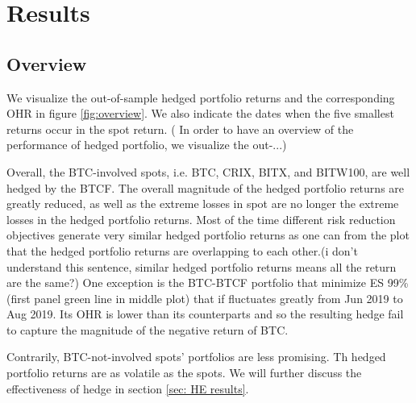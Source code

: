 \section{Results}\label{sec:results}

%


\subsection{Overview}\label{sec:overview}
We visualize the out-of-sample hedged portfolio returns and the corresponding OHR in figure \ref{fig:overview}.
We also indicate the dates when the five smallest returns occur in the spot return. \textcolor{plt4}{( In order to have an overview of the performance of hedged portfolio, we visualize the out-...)}\medskip

Overall, the BTC-involved spots, i.e. BTC, CRIX, BITX, and BITW100,  are well hedged by the BTCF.
The overall magnitude of the hedged portfolio returns are greatly reduced, as well as the extreme losses in spot are no longer the extreme losses in the hedged portfolio returns.
Most of the time different risk reduction objectives generate very similar hedged portfolio returns as one can from the plot that the hedged portfolio returns are overlapping to each other.\textcolor{plt4}{(i don't understand this sentence, similar hedged portfolio returns means all the return are the same?)}
One exception is the BTC-BTCF portfolio that minimize ES 99\% (first panel green line in middle plot) that if fluctuates greatly from Jun 2019 to Aug 2019.
Its OHR is lower than its counterparts and so the resulting hedge fail to capture the magnitude of the negative return of BTC. \medskip

Contrarily, BTC-not-involved spots' portfolios are less promising.
Th hedged portfolio returns are as volatile as the spots.
We will further discuss the effectiveness of hedge in section \ref{sec: HE results}.

